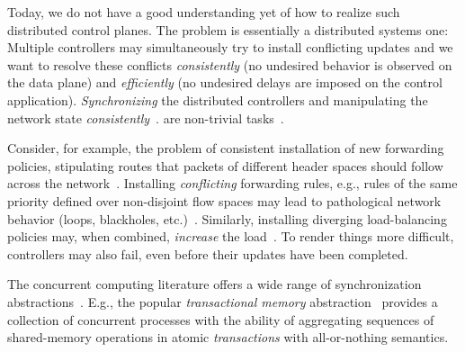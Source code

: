 \documentclass[conference]{sigcomm-alternate}
\begin{document}

Today, we do not have a good understanding yet of how to realize
such distributed control planes. The problem is essentially a
distributed systems
one: Multiple controllers may simultaneously try to
install conflicting updates and we want to resolve these conflicts
\emph{consistently} (no undesired behavior is observed on the data
plane) and \emph{efficiently} (no undesired delays are imposed on the
control application).
\emph{Synchronizing}
the distributed controllers and manipulating the network state \emph{consistently}~\cite{cpc}.
are non-trivial tasks~\cite{cap-theorem}.

Consider, for example, the problem of
consistent installation of new forwarding policies, stipulating routes
that packets of different header spaces should follow across the
network~\cite{network-update,roger-hotnets,correct,stn}.
Installing \emph{conflicting} forwarding rules, e.g., rules of the same priority defined over non-disjoint
flow spaces may lead to pathological network behavior (loops,
blackholes, etc.)~\cite{cpc}.
Similarly, installing diverging load-balancing policies may,
when combined, \emph{increase} the load~\cite{log-cent}.
To render things more difficult, controllers may also fail,
even before their updates have been completed.

The concurrent computing literature offers
a wide range of synchronization abstractions~\cite{HS08-book}. 
E.g., the popular \emph{transactional
  memory} abstraction~\cite{stm-st95,tm-book} provides a collection of
concurrent processes with the ability of aggregating sequences of
shared-memory operations in atomic \emph{transactions} with
all-or-nothing semantics.   

\end{document}
